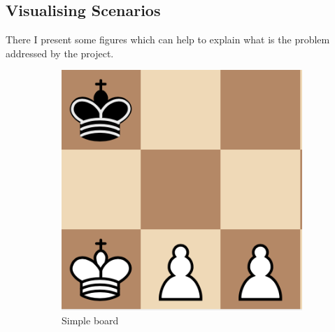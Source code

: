 \documentclass{article}
\begin{document}
				\newpage


				\subsection{Visualising Scenarios}

				There I present some figures which can help to explain what is the problem addressed by the project.\medskip\medskip\\

		\begin{figure}[h]
		\centering
        \begin{subfigure}{0.26\textwidth}
                \includegraphics[width=\linewidth]{simple_board}
                \caption{Simple board}
        \end{subfigure}\quad
        \begin{subfigure}{0.26\textwidth}

\end{subfigure}
\end{figure}
\end{document}
